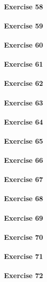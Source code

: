 \paragraph{Exercise 58}
\paragraph{Exercise 59}
\paragraph{Exercise 60}
\paragraph{Exercise 61}
\paragraph{Exercise 62}
\paragraph{Exercise 63}
\paragraph{Exercise 64}
\paragraph{Exercise 65}
\paragraph{Exercise 66}
\paragraph{Exercise 67}
\paragraph{Exercise 68}
\paragraph{Exercise 69}
\paragraph{Exercise 70}
\paragraph{Exercise 71}
\paragraph{Exercise 72}
